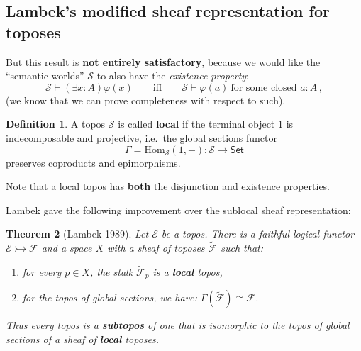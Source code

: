 \documentclass[11pt]{article}
\newcommand{\E}{\ensuremath{\mathcal{E}}}
\newcommand{\Set}{\ensuremath{\mathsf{Set}}}
\renewcommand{\hom}{\ensuremath{\mathrm{Hom}}}
\newtheorem{theorem}{Theorem}
\theoremstyle{remark}
\theoremstyle{definition}
\newtheorem{definition}[theorem]{Definition}
\newcommand{\myemph}[1]{\textbf{#1}}
\begin{document}
\subsection{Lambek's modified sheaf representation for toposes}

But this result is \myemph{not entirely satisfactory}, because we would like the ``semantic worlds'' $\mathcal{S}$ to also have the \emph{existence property}:
\[
\mathcal{S}\vdash (\exists x:A)\varphi(x) \qquad\text{iff}\qquad  \mathcal{S}\vdash \varphi(a)\ \text{for some closed $a:A$}\,,
\] 
(we know that we can prove completeness with respect to such).
\medskip

\begin{definition}
A topos $\mathcal{S}$ is called \myemph{local} if the terminal object $1$ is indecomposable and projective, i.e.\ the global sections functor 
\[
\Gamma = \hom_\mathcal{S}(1, - ) : \mathcal{S} \to \Set
\]
preserves coproducts and epimorphisms.
\end{definition}
\medskip

Note that a local topos has \myemph{both} the disjunction and existence properties.


Lambek gave the following improvement over the sublocal sheaf representation:

\begin{theorem}[Lambek 1989]
Let $\E$ be a topos.  
There is a faithful logical functor $\E\rightarrowtail\mathcal{F}$ 
and a space $X$ with a sheaf of toposes 
$\tilde{\mathcal{F}}$ such that:
\begin{enumerate}
\item for every $p\in X$, the stalk $\tilde{\mathcal{F}}_p$ is a \myemph{local} topos, 
\item for the topos of global sections, we have: $\Gamma(\tilde{\mathcal{F}}) \cong \mathcal{F}$.
\end{enumerate}
Thus every topos is a \myemph{subtopos} of one that is isomorphic to the topos of global sections of a sheaf of \myemph{local} toposes.  
\end{theorem}
\medskip
\end{document}

